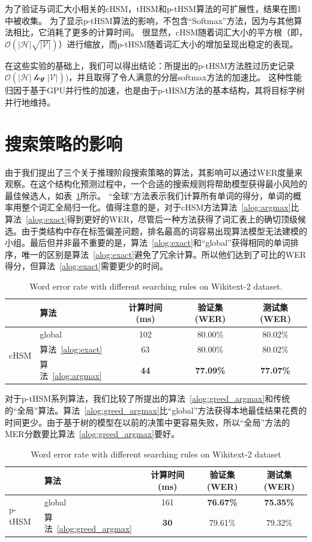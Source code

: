 为了验证与词汇大小相关的cHSM，tHSM和p-tHSM算法的可扩展性，结果在图1中被收集。 为了显示p-tHSM算法的影响，不包含“Softmax”方法，因为与其他算法相比，它消耗了更多的计算时间。 很显然，cHSM随着词汇大小的平方根（即，$ \mathcal{O(| H | \sqrt{| V |})} $）进行缩放，而p-tHSM随着词汇大小的增加呈现出稳定的表现。

在这些实验的基础上，我们可以得出结论：所提出的p-tHSM方法胜过历史记录$ \mathcal{O(| H | \log| V |)})$，并且取得了令人满意的分层softmax方法的加速比。 这种性能归因于基于GPU并行性的加速，也是由于p-tHSM方法的基本结构，其将目标字树并行地维持。



\section{搜索策略的影响}
由于我们提出了三个关于推理阶段搜索策略的算法，其影响可以通过WER度量来观察。在这个结构化预测过程中，一个合适的搜索规则将帮助模型获得最小风险的最佳候选人，如表~\ref{tab:search}所示。 “全球”方法表示我们计算所有单词的得分，单词的概率用整个词汇全局归一化。值得注意的是，对于cHSM方法算法~\ref{alog:argmax}比算法~\ref{alog:exact}得到更好的WER，尽管后一种方法获得了词汇表上的确切顶级候选。由于类结构中存在标签偏差问题，排名最高的词容易出现算法模型无法建模的小组。最后但并非最不重要的是，算法~\ref{alog:exact}和``global''获得相同的单词排序，唯一的区别是算法~\ref{alog:exact}避免了冗余计算。所以他们达到了可比的WER得分，但算法~\ref{alog:exact}需要更少的时间。
\begin{table}[!ht]
  \centering
  \caption{Word error rate with different searching rules on Wikitext-2 dataset.\label{tab:search}}
\begin{tabular}{llccc}
  \toprule
   & 算法&计算时间 (ms)&验证集 (WER)& 测试集(WER)\\ \midrule
  \multirow{3}{*}{cHSM} &global&102& 80.00\%& 80.02\%\\
        &算法~\ref{alog:exact}&63& 80.00\%& 80.02\%\\
        &算法~\ref{alog:argmax}&\textbf{44}&\textbf{ 77.09\%}&\textbf{ 77.07\%}\\
  \bottomrule
\end{tabular}
\end{table}


对于p-tHSM系列算法，我们比较了所提出的算法~\ref{alog:greed_argmax}和传统的“全局”算法。算法~\ref{alog:greed_argmax}比“global”方法获得本地最佳结果花费的时间更少。由于基于树的模型在以前的决策中更容易失败，所以“全局”方法的MER分数要比算法~\ref{alog:greed_argmax}要好。
\begin{table}[!ht]
  \centering
  \caption{Word error rate with different searching rules on Wikitext-2 dataset\label{tab:psearch}}
\begin{tabular}{llccc}
  \toprule
        & 算法&计算时间 (ms)&验证集 (WER)& 测试集(WER)\\ \midrule
  \multirow{2}{*}{p-tHSM}  &global&161& \textbf{76.67\%}&\textbf{75.35\%}\\
        &算法~\ref{alog:greed_argmax}&\textbf{30} & 79.61\%&79.32\%\\
  \bottomrule
\end{tabular}
\end{table}


